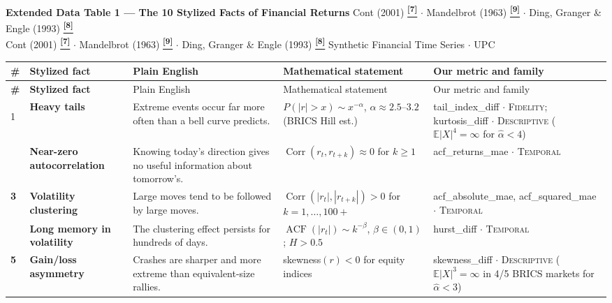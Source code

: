 \documentclass[10pt]{article}
\newcommand{\pagehead}[2]{%
  \begin{tcolorbox}[enhanced,arc=0pt,outer arc=0pt,boxrule=0pt,
    colback=Navy,colframe=Navy,
    top=5pt,bottom=5pt,left=8pt,right=8pt,
    before skip=0pt,after skip=10pt]
  {\color{white}\large\bfseries #1}%
  \ifx\relax#2\relax\else\\[1pt]{\color{blue!30!white}\small #2}\fi
  \hfill{\color{blue!20!white}\footnotesize Synthetic Financial Time Series $\cdot$ UPC}
  \end{tcolorbox}}
\newcommand{\tcite}[1]{%
  \hyperlink{R:#1}{\textsuperscript{\scriptsize\textbf{[#1]}}}}
\newcommand{\E}{\mathbb{E}}
\begin{document}
\pagehead{Extended Data Table 1 --- The 10 Stylized Facts of Financial Returns}
         {Cont (2001)\tcite{7} $\cdot$ Mandelbrot (1963)\tcite{9} $\cdot$ Ding, Granger \& Engle (1993)\tcite{8}}

\vspace{2pt}
\small
\setlength{\tabcolsep}{5pt}
\renewcommand{\arraystretch}{1.4}
\begin{longtable}{%
  >{\bfseries\centering}p{}
  >{\bfseries}p{}
  p{}
  p{}
  p{}}

\rowcolor{Navy}
{\color{white}\#} &
{\color{white}Stylized fact} &
{\color{white}Plain English} &
{\color{white}Mathematical statement} &
{\color{white}Our metric and family} \\[2pt]
\endfirsthead
\rowcolor{Navy}
{\color{white}\#} &
{\color{white}Stylized fact} &
{\color{white}Plain English} &
{\color{white}Mathematical statement} &
{\color{white}Our metric and family} \\[2pt]
\endhead

\rowcolor{TabOdd}
1 & Heavy tails &
  Extreme events occur far more often than a bell curve predicts. &
  $P(|r|>x) \sim x^{-\alpha}$, $\alpha \approx 2.5$--$3.2$ (BRICS Hill est.) &
  tail\_index\_diff $\cdot$ \textsc{Fidelity}; kurtosis\_diff $\cdot$ \textsc{Descriptive} ($\E|X|^4=\infty$ for $\hat{\alpha}<4$) \\

2 & Near-zero autocorrelation &
  Knowing today's direction gives no useful information about tomorrow's. &
  $\operatorname{Corr}(r_t, r_{t+k}) \approx 0$ for $k \geq 1$ &
  acf\_returns\_mae $\cdot$ \textsc{Temporal} \\

\rowcolor{TabOdd}
3 & Volatility clustering &
  Large moves tend to be followed by large moves. &
  $\operatorname{Corr}(|r_t|, |r_{t+k}|) > 0$ for $k = 1, \ldots, 100{+}$ &
  acf\_absolute\_mae, acf\_squared\_mae $\cdot$ \textsc{Temporal} \\

4 & Long memory in volatility &
  The clustering effect persists for hundreds of days. &
  $\operatorname{ACF}(|r_t|) \sim k^{-\beta}$, $\beta \in (0,1)$; $H > 0.5$ &
  hurst\_diff $\cdot$ \textsc{Temporal} \\

\rowcolor{TabOdd}
5 & Gain/loss asymmetry &
  Crashes are sharper and more extreme than equivalent-size rallies. &
  skewness$(r) < 0$ for equity indices &
  skewness\_diff $\cdot$ \textsc{Descriptive} ($\E|X|^3=\infty$ in 4/5 BRICS markets for $\hat{\alpha}<3$) \\


\end{longtable}
\end{document}
